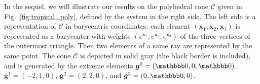 \documentclass[proceedings]{stacs}
\newcommand{\vect}[1]{\boldsymbol #1}
\newcommand{\CC}{\mathcal{C}}
\begin{document}
In the sequel, we will illustrate our results on the polyhedral cone $\CC$ given in Fig.~\ref{fig:tropical_poly}, defined by the system in the right side. The left side is a representation of $\CC$ in barycentric coordinates: each element $(\vect{x}_1,\vect{x}_2,\vect{x}_3)$ is represented as a barycenter with weights $(e^{\vect{x}_1}, e^{\vect{x}_2}, e^{\vect{x}_3})$ of the three vertices of the outermost triangle. Then two
elements of a same ray are represented by the same point. 
The cone $\CC$ is depicted in solid gray (the black border is included), and is generated by the extreme elements $\vect{g}^0 = (\mpzero,0,\mpzero)$, $\vect{g}^1 = (-2,1,0)$, $\vect{g}^2 = (2,2,0)$, and $\vect{g}^3 = (0,\mpzero,0)$.
\end{document}
